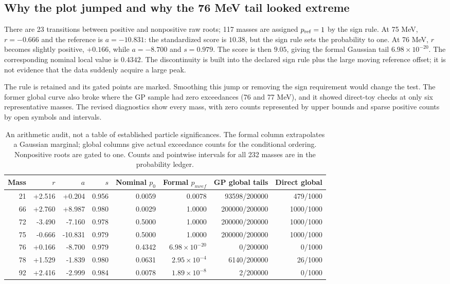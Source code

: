 \subsection*{Why the plot jumped and why the 76 MeV tail looked extreme}
There are 23 transitions between positive and nonpositive raw roots; 117 masses are assigned $p_{\rm ref}=1$ by the sign rule. At 75 MeV, $r=-0.666$ and the reference is $a=-10.831$: the standardized score is $10.38$, but the sign rule sets the probability to one. At 76 MeV, $r$ becomes slightly positive, $+0.166$, while $a=-8.700$ and $s=0.979$. The score is then $9.05$, giving the formal Gaussian tail $6.98\times10^{-20}$. The corresponding nominal local value is $0.4342$. The discontinuity is built into the declared sign rule plus the large moving reference offset; it is not evidence that the data suddenly acquire a large peak.

The rule is retained and its gated points are marked. Smoothing this jump or removing the sign requirement would change the test. The former global curve also broke where the GP sample had zero exceedances (76 and 77 MeV), and it showed direct-toy checks at only six representative masses. The revised diagnostics show every mass, with zero counts represented by upper bounds and sparse positive counts by open symbols and intervals.
\begin{table}[H]\centering\small
\begin{tabular}{rrrrrrrr}\toprule
Mass & $r$ & $a$ & $s$ & Nominal $p_0$ & Formal $p_{
m ref}$ & GP global tails & Direct global\\\midrule
21 & +2.516 & +0.204 & 0.956 & 0.0059 & 0.0078 & 93598/200000 & 479/1000\\
66 & +2.760 & +8.987 & 0.980 & 0.0029 & 1.0000 & 200000/200000 & 1000/1000\\
72 & -3.490 & -7.160 & 0.978 & 0.5000 & 1.0000 & 200000/200000 & 1000/1000\\
75 & -0.666 & -10.831 & 0.979 & 0.5000 & 1.0000 & 200000/200000 & 1000/1000\\
76 & +0.166 & -8.700 & 0.979 & 0.4342 & $6.98\times10^{-20}$ & 0/200000 & 0/1000\\
78 & +1.529 & -1.839 & 0.980 & 0.0631 & $2.95\times10^{-4}$ & 6140/200000 & 26/1000\\
92 & +2.416 & -2.999 & 0.984 & 0.0078 & $1.89\times10^{-8}$ & 2/200000 & 0/1000\\
\bottomrule\end{tabular}
\caption{An arithmetic audit, not a table of established particle significances. The formal column extrapolates a Gaussian marginal; global columns give actual exceedance counts for the conditional ordering. Nonpositive roots are gated to one. Counts and pointwise intervals for all 232 masses are in the probability ledger.}\end{table}

